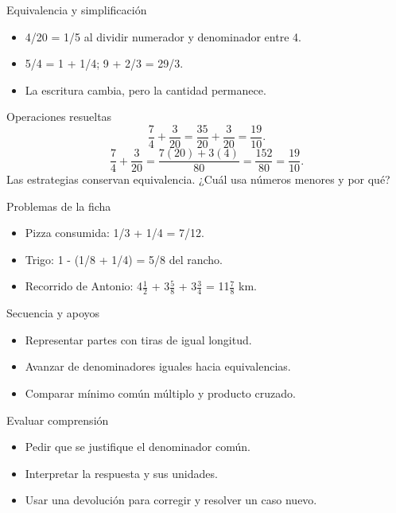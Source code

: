 \documentclass[
	spanish,
	aspectratio=1610,
	xcolor={dvipsnames,table}
]{beamer}
\begin{document}
\begin{frame}{Equivalencia y simplificación}
\fontsize{14}{18}\selectfont\begin{itemize}\setlength{\itemsep}{.45cm}
\item 4/20 = 1/5 al dividir numerador y denominador entre 4.
\item 5/4 = 1 + 1/4; 9 + 2/3 = 29/3.
\item La escritura cambia, pero la cantidad permanece.
\end{itemize}
\end{frame}
\begin{frame}{Operaciones resueltas}
\fontsize{14}{18}\selectfont\[\frac74+\frac3{20}=\frac{35}{20}+\frac3{20}=\frac{19}{10}.\]
\[\frac74+\frac3{20}=\frac{7(20)+3(4)}{80}=\frac{152}{80}=\frac{19}{10}.\]
\vspace{.25cm}Las estrategias conservan equivalencia. ¿Cuál usa números menores y por qué?
\end{frame}
\begin{frame}{Problemas de la ficha}
\fontsize{14}{18}\selectfont\begin{itemize}\setlength{\itemsep}{.45cm}
\item Pizza consumida: 1/3 + 1/4 = 7/12.
\item Trigo: 1 - (1/8 + 1/4) = 5/8 del rancho.
\item Recorrido de Antonio: 4$\frac12$ + 3$\frac58$ + 3$\frac34$ = 11$\frac78$ km.
\end{itemize}
\end{frame}
\begin{frame}{Secuencia y apoyos}
\fontsize{14}{18}\selectfont\begin{itemize}\setlength{\itemsep}{.45cm}
\item Representar partes con tiras de igual longitud.
\item Avanzar de denominadores iguales hacia equivalencias.
\item Comparar mínimo común múltiplo y producto cruzado.
\end{itemize}
\end{frame}
\begin{frame}{Evaluar comprensión}
\fontsize{14}{18}\selectfont\begin{itemize}\setlength{\itemsep}{.45cm}
\item Pedir que se justifique el denominador común.
\item Interpretar la respuesta y sus unidades.
\item Usar una devolución para corregir y resolver un caso nuevo.
\end{itemize}
\end{frame}
\end{document}
